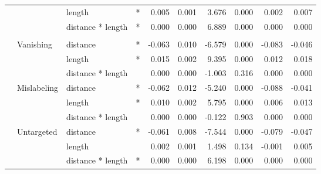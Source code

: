 \begin{longtable}[t]{llllrrrrrr}
\cmidrule{3-10}\nopagebreak
\hspace{1em} &  & length & * & 0.005 & 0.001 & 3.676 & 0.000 & 0.002 & 0.007\\
\cmidrule{3-10}\nopagebreak
\hspace{1em} &  & distance * length & * & 0.000 & 0.000 & 6.889 & 0.000 & 0.000 & 0.000\\
\cmidrule{1-10}\pagebreak[0]
\addlinespace[0.3em]
\multicolumn{10}{l}{\textbf{Cascade R-CNN}}\\
\hspace{1em} & Vanishing & distance & * & -0.063 & 0.010 & -6.579 & 0.000 & -0.083 & -0.046\\
\cmidrule{3-10}\nopagebreak
\hspace{1em} &  & length & * & 0.015 & 0.002 & 9.395 & 0.000 & 0.012 & 0.018\\
\cmidrule{3-10}\nopagebreak
\hspace{1em} &  & distance * length &  & 0.000 & 0.000 & -1.003 & 0.316 & 0.000 & 0.000\\
\cmidrule{2-10}\nopagebreak
\hspace{1em} & Mislabeling & distance & * & -0.062 & 0.012 & -5.240 & 0.000 & -0.088 & -0.041\\
\cmidrule{3-10}\nopagebreak
\hspace{1em} &  & length & * & 0.010 & 0.002 & 5.795 & 0.000 & 0.006 & 0.013\\
\cmidrule{3-10}\nopagebreak
\hspace{1em} &  & distance * length &  & 0.000 & 0.000 & -0.122 & 0.903 & 0.000 & 0.000\\
\cmidrule{2-10}\nopagebreak
\hspace{1em} & Untargeted & distance & * & -0.061 & 0.008 & -7.544 & 0.000 & -0.079 & -0.047\\
\cmidrule{3-10}\nopagebreak
\hspace{1em} &  & length &  & 0.002 & 0.001 & 1.498 & 0.134 & -0.001 & 0.005\\
\cmidrule{3-10}\nopagebreak
\hspace{1em} &  & distance * length & * & 0.000 & 0.000 & 6.198 & 0.000 & 0.000 & 0.000\\
\bottomrule
\end{longtable}
\endgroup{}



\begingroup\fontsize{9}{11}\selectfont

